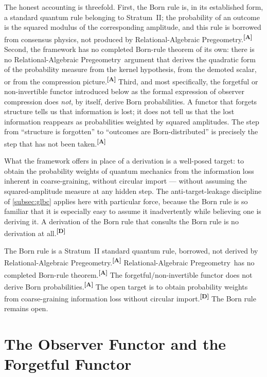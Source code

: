 \documentclass[12pt,a4paper,twoside]{article}
\theoremstyle{plain}
\theoremstyle{definition}
\theoremstyle{remark}
\newcommand{\ProjectShort}{Relational-Algebraic Pregeometry}
\newcommand{\RAP}{\ProjectShort}
\newcommand{\catmark}[1]{\textsuperscript{\textsf{\textbf{[#1]}}}}
\begin{document}
The honest accounting is threefold. First, the Born rule is, in its
established form, a standard quantum rule belonging to Stratum~II; the
probability of an outcome is the squared modulus of the corresponding
amplitude, and this rule is borrowed from consensus physics, not
produced by \RAP.\catmark{A} Second, the framework has no completed
Born-rule theorem of its own: there is no \RAP\ argument that derives
the quadratic form of the probability measure from the kernel
hypothesis, from the demoted scalar, or from the compression
picture.\catmark{A} Third, and most specifically, the forgetful or
non-invertible functor introduced below as the formal expression of
observer compression does \emph{not}, by itself, derive Born
probabilities. A functor that forgets structure tells us that
information is lost; it does not tell us that the lost information
reappears as probabilities weighted by squared amplitudes. The step from
``structure is forgotten'' to ``outcomes are Born-distributed'' is
precisely the step that has not been taken.\catmark{A}

What the framework offers in place of a derivation is a well-posed
target: to obtain the probability weights of quantum mechanics from the
information loss inherent in coarse-graining, without circular import
--- without assuming the squared-amplitude measure at any hidden step.
The anti-target-leakage discipline of \cref{subsec:glbc} applies here
with particular force, because the Born rule is so familiar that it is
especially easy to assume it inadvertently while believing one is
deriving it. A derivation of the Born rule that consults the Born rule
is no derivation at all.\catmark{D}

\begin{governancebox}
The Born rule is a Stratum~II standard quantum rule, borrowed, not
derived by \RAP.\catmark{A} \RAP\ has no completed Born-rule
theorem.\catmark{A} The forgetful/non-invertible functor does not derive
Born probabilities.\catmark{A} The open target is to obtain probability
weights from coarse-graining information loss without circular
import.\catmark{D} The Born rule remains open.
\end{governancebox}

\newpage
\section{The Observer Functor and the Forgetful Functor}
\label{sec:observer-functor}
\end{document}
